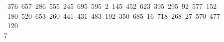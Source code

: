 \begin{tabbing}
\ 376\ 657\ 286\ 555\ 245\ 695\ 595\ 2\ 145\ 452\ 623\ 395\ 295\ 92\ 577\ 152\ \\[0pt]
\ 180\ 520\ 653\ 260\ 441\ 431\ 483\ 192\ 350\ 685\ 16\ 718\ 268\ 27\ 570\ 477\\[0pt]
\>\ 120\\[0pt]
7\>\end{tabbing}
